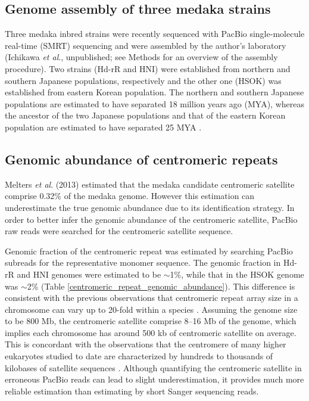 \subsection*{Genome assembly of three medaka strains}
  Three medaka inbred strains were recently sequenced with PacBio single-molecule real-time (SMRT) sequencing and were assembled by the author's laboratory (Ichikawa \textit{et al}., unpublished; see Methods for an overview of the assembly procedure). Two strains (Hd-rR and HNI) were established from northern and southern Japanese populations, respectively and the other one (HSOK) was established from eastern Korean population. The northern and southern Japanese populations are estimated to have separated 18 million years ago (MYA), whereas the ancestor of the two Japanese populations and that of the eastern Korean population are estimated to have separated 25 MYA \cite{Setiamarga}.



\subsection*{Genomic abundance of centromeric repeats}
  Melters \textit{et al}. (2013) estimated that the medaka candidate centromeric satellite comprise 0.32\% of the medaka genome. However this estimation can underestimate the true genomic abundance due to its identification strategy. In order to better infer the genomic abundance of the centromeric satellite, PacBio raw reads were searched for the centromeric satellite sequence.

  Genomic fraction of the centromeric repeat was estimated by searching PacBio subreads for the representative monomer sequence. The genomic fraction in Hd-rR and HNI genomes were estimated to be $\sim$1\%, while that in the HSOK genome was $\sim$2\% (Table \ref{centromeric_repeat_genomic_abundance}). This difference is consistent with the previous observations that centromeric repeat array size in a chromosome can vary up to 20-fold within a species \cite{Miga}. Assuming the genome size to be 800 Mb, the centromeric satellite comprise 8--16 Mb of the genome, which implies each chromosome has around 500 kb of centromeric satellite on average. This is concordant with the observations that the centromere of many higher eukaryotes studied to date are characterized by hundreds to thousands of kilobases of satellite sequences \cite{Plohl}. Although quantifying the centromeric satellite in erroneous PacBio reads can lead to slight underestimation, it provides much more reliable estimation than estimating by short Sanger sequencing reads.

